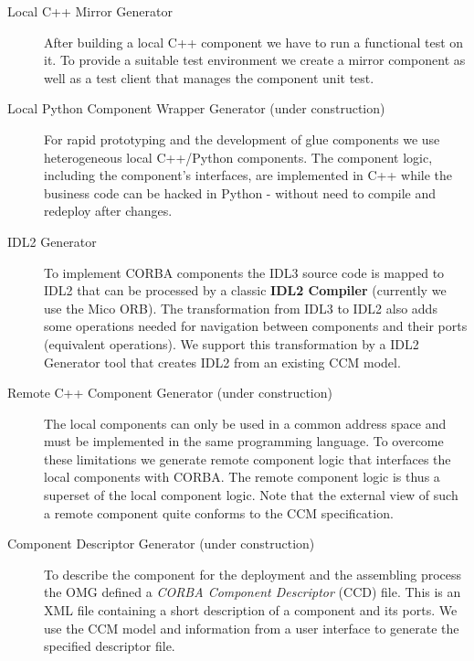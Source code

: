 \begin{description}
\item [Local C++ Mirror Generator]
After building a local C++ component we have to run a functional test on it. To
provide a suitable test environment we create a mirror component as well as a
test client that manages the component unit test.

\item [Local Python Component Wrapper Generator (under construction)]
For rapid prototyping and the development of glue components we use
heterogeneous local C++/Python components. The component logic, including the
component's interfaces, are implemented in C++ while the business code can be
hacked in Python - without need to compile and redeploy after changes.

\item [IDL2 Generator]
To implement CORBA components the IDL3 source code is mapped to IDL2 that can be
processed by a classic {\bf IDL2 Compiler} (currently we use the Mico ORB). The
transformation from IDL3 to IDL2 also adds some operations needed for navigation
between components and their ports (equivalent operations). We support this
transformation by a IDL2 Generator tool that creates IDL2 from an existing CCM
model.

\item [Remote C++ Component Generator (under construction)]
The local components can only be used in a common address space and must be
implemented in the same programming language. To overcome these limitations we
generate remote component logic that interfaces the local components with CORBA.
The remote component logic is thus a superset of the local component logic. Note
that the external view of such a remote component quite conforms to the CCM
specification.

\item [Component Descriptor Generator (under construction)]
To describe the component for the deployment and the assembling process the OMG
defined a {\it CORBA Component Descriptor} (CCD) file. This is an XML file
containing a short description of a component and its ports. We use the CCM
model and information from a user interface to generate the specified descriptor
file.

\end{description}


